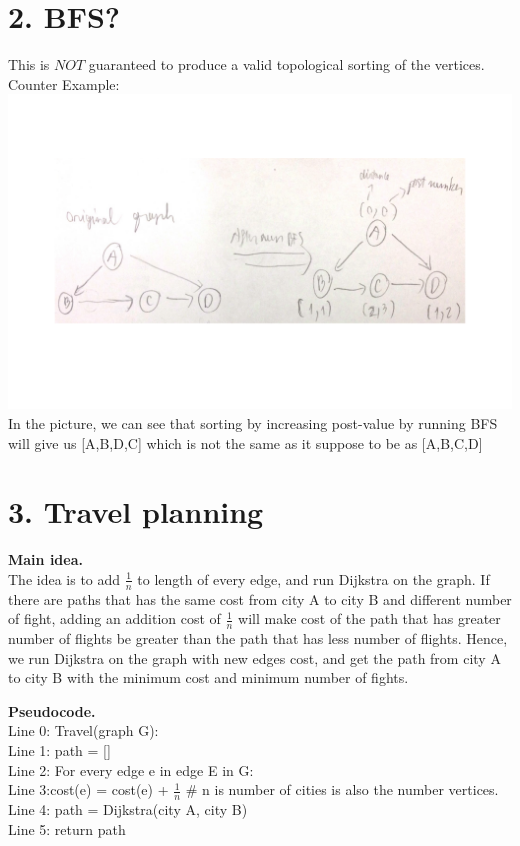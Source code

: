 \documentclass[11pt]{article}
\newcommand{\tab}{\hspace*{2em}}
\begin{document}
\section*{2. BFS?}
This is $\boxed{NOT}$ guaranteed to produce a valid topological sorting of the vertices.\\
Counter Example:\\
\includegraphics[scale=0.3]{p2.png}\\
In the picture, we can see that sorting by increasing post-value by running BFS will give us [A,B,D,C] which is not the same as it suppose to be as [A,B,C,D]

\newpage
\section*{3. Travel planning}
\noindent
\textbf{Main idea.}\\
The idea is to add $\frac{1}{n}$ to length of every edge, and run Dijkstra on the graph. If there are paths that has the same cost from city A to city B and different number of fight, adding an addition cost of $\frac{1}{n}$ will make cost of the path that has greater number of flights be greater than the path that has less number of flights. Hence, we run Dijkstra on the graph with new edges cost, and get the path from city A to city B with the minimum cost and minimum number of fights.


\noindent
\textbf{Pseudocode.}\\
Line 0: Travel(graph G):\\
Line 1: path = []\\
Line 2: For every edge e in edge E in G:\\
Line 3:\tab cost(e) = cost(e) + $\frac{1}{n}$ \# n is number of cities is also the number vertices.\\
Line 4: path = Dijkstra(city A, city B)\\
Line 5: return path\\
\end{document}

